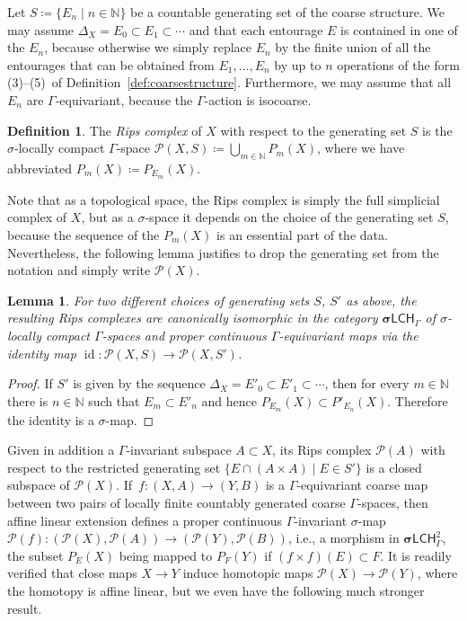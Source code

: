 \documentclass[pdftex]{sigma}
\numberwithin{equation}{section}
\newtheorem{lem}[thm]{Lemma}
\theoremstyle{definition}
\newtheorem{defn}[thm]{Definition}
\newcommand{\N}{\mathbb{N}}
\newcommand{\cP}{\mathcal{P}}
\newcommand{\categoryfont}[1]{\mathsf{#1}}
\newcommand{\sLCH}[1][\Gamma]{\boldsymbol\sigma\categoryfont{LCH}_{#1}}
\newcommand{\sLCHz}[1][\Gamma]{\boldsymbol\sigma\categoryfont{LCH}_{#1}^2}
\newcommand{\Diag}[1][]{{\Delta_{#1}}}
\DeclareMathOperator{\id}{id}
\begin{document}
Let $S\coloneqq\{E_n\mid n\in\N\}$ be a countable generating set of the coarse structure. We may assume $\Diag[X]=E_0\subset E_1\subset\cdots$ and that each entourage $E$ is contained in one of the $E_n$, because otherwise we simply replace $E_n$ by the finite union of all the entourages that can be obtained from $E_1,\dots,E_n$ by up to $n$ operations of the form (3)--(5)\ of Definition~\ref{def:coarsestructure}. Furthermore, we may assume that all $E_n$ are $\Gamma$-equivariant, because the $\Gamma$-action is isocoarse.
\begin{defn}
The \emph{Rips complex} of $X$ with respect to the generating set $S$ is the $\sigma$-locally compact $\Gamma$-space $\cP(X,S)\coloneqq\bigcup_{m\in\N} P_m(X)$, where we have abbreviated $P_m(X)\coloneqq P_{E_m}(X)$.
\end{defn}

Note that as a topological space, the Rips complex is simply the full simplicial complex of $X$, but as a $\sigma$-space it depends on the choice of the generating set $S$, because the sequence of the $P_m(X)$ is an essential part of the data.
Nevertheless, the following lemma justifies to drop the generating set from the notation and simply write $\cP(X)$.

\begin{lem}
For two different choices of generating sets $S$, $S'$ as above, the resulting Rips complexes are canonically isomorphic in the category $\sLCH$ of $\sigma$-locally compact $\Gamma$-spaces and proper continuous $\Gamma$-equivariant maps via the identity map $\id\colon\cP(X,S)\to\cP(X,S')$.
\end{lem}
\begin{proof}
If $S'$ is given by the sequence $\Diag[X]=E'_0\subset E'_1\subset\cdots$, then for every $m\in\N$ there is $n\in\N$ such that $E_m\subset E'_n$ and hence $P_{E_m}(X)\subset P'_{E_n}(X)$. Therefore the identity is a $\sigma$-map.
\end{proof}

Given in addition a $\Gamma$-invariant subspace $A\subset X$, its Rips complex $\cP(A)$ with respect to the restricted generating set $\{E\cap(A\times A)\mid E\in S'\}$ is a closed subspace of $\cP(X)$.
If~$f\colon (X,A)\to (Y,B)$ is a $\Gamma$-equivariant coarse map between two pairs of locally finite countably generated coarse $\Gamma$-spaces, then affine linear extension defines a proper continuous $\Gamma$-invariant $\sigma$-map $\cP(f)\colon (\cP(X),\cP(A))\to(\cP(Y),\cP(B))$, i.e., a morphism in $\sLCHz$, the subset $P_E(X)$ being mapped to $P_F(Y)$ if $(f\times f)(E)\subset F$.
It is readily verified that close maps $X\to Y$ induce homotopic maps $\cP(X)\to\cP(Y)$, where the homotopy is affine linear, but we even have the following much stronger result.
\end{document}
